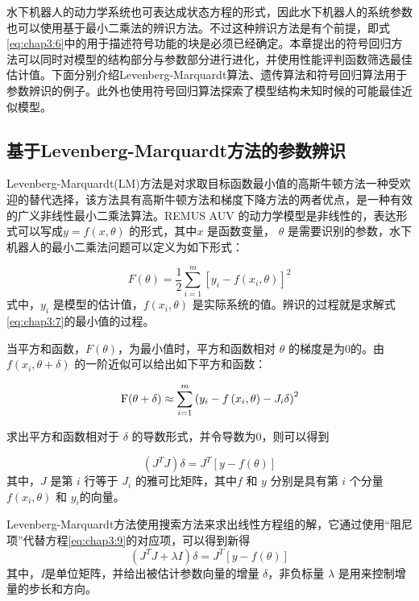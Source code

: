 水下机器人的动力学系统也可表达成状态方程的形式，因此水下机器人的系统参数也可以使用基于最小二乘法的辨识方法\cite{baruch2009levenberg}。不过这种辨识方法是有个前提，即式\ref{eq:chap3:6}中的用于描述符号功能的块是必须已经确定。本章提出的符号回归方法可以同时对模型的结构部分与参数部分进行进化，并使用性能评判函数筛选最佳估计值。下面分别介绍Levenberg-Marquardt算法、遗传算法和符号回归算法用于参数辨识的例子。此外也使用符号回归算法探索了模型结构未知时候的可能最佳近似模型。

\subsection{基于Levenberg-Marquardt方法的参数辨识 }

 Levenberg-Marquardt(LM)方法是对求取目标函数最小值的高斯牛顿方法一种受欢迎的替代选择，该方法具有高斯牛顿方法和梯度下降方法的两者优点，是一种有效的广义非线性最小二乘法算法\cite{baruch2009levenberg}。REMUS AUV 的动力学模型是非线性的，表达形式可以写成$y=f(x,\theta)$ 的形式，其中$x$ 是函数变量， $\theta$ 是需要识别的参数，水下机器人的最小二乘法问题可以定义为如下形式：

\begin{equation}
\label{eq:chap3:7}
F\left( \theta  \right) = \frac{1}{2}\sum\limits_{i = 1}^m {{{\left[ {{y_i} - f\left( {{x_i},\theta } \right)} \right]}^2}}
\end{equation}
式中，$y_i$ 是模型的估计值，$f(x_i,\theta)$ 是实际系统的值。辨识的过程就是求解式\ref{eq:chap3:7}的最小值的过程。

当平方和函数，$ F(\theta)$，为最小值时，平方和函数相对 $\theta$ 的梯度是为0的。由 $f(x_i,\theta+\delta)$ 的一阶近似可以给出如下平方和函数：

\begin{equation}
\label{eq:chap3:8}
{\rm{F}}(\theta  + \delta ) \approx \sum\limits_{i = 1}^m {{{\left( {{y_i} - f\left( {{x_i},\theta } \right) - {J_i}\delta } \right)}^2}}
\end{equation}

求出平方和函数相对于 $\delta$ 的导数形式，并令导数为0，则可以得到

\begin{equation}
\label{eq:chap3:9}
\left( {{J^T}J} \right)\delta  = {J^T}\left[ {y - f\left( \theta  \right)} \right]
\end{equation}
其中，$J$ 是第 $i$ 行等于 $J_i$ 的雅可比矩阵，其中$f$ 和 $y$ 分别是具有第 $i$ 个分量 $f(x_i,\theta)$ 和 $y_i$的向量。

Levenberg-Marquardt方法使用搜索方法来求出线性方程组的解，它通过使用“阻尼项”代替方程\ref{eq:chap3:9}的对应项，可以得到新得
\begin{equation}
\label{eq:chap3:10}
\left( {{J^T}J + \lambda I} \right)\delta  = {J^T}\left[ {y - f\left( \theta  \right)} \right]
\end{equation}
其中，\textit{I}是单位矩阵，并给出被估计参数向量的增量 $
\delta$，非负标量 $\lambda$ 是用来控制增量的步长和方向。


